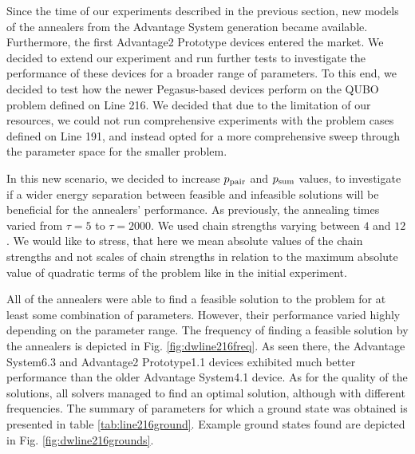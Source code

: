 Since the time of our experiments described in the previous section, new models
of the annealers from the Advantage System generation became available.
Furthermore, the first Advantage2 Prototype devices entered the market. We
decided to extend our experiment and run further tests to investigate the
performance of these devices for a broader range of parameters. To this end, we
decided to test how the newer Pegasus-based devices perform on the QUBO problem
defined on Line 216. We decided that due to the limitation of our resources, we
could not run comprehensive experiments with the problem cases defined on Line
191, and instead opted for a more comprehensive sweep through the parameter
space for the smaller problem.

In this new scenario, we decided to increase $p_{\text{pair}}$ and $p_{\text{sum}}$ values, to
investigate if a wider energy separation between feasible and infeasible
solutions will be beneficial for the annealers' performance. As previously, the
annealing times varied from $\tau=5$ to $\tau=2000$. We used chain strengths
varying between $4$ and $12$. We would like to stress, that here we mean
absolute values of the chain strengths and not scales of chain strengths in
relation to the maximum absolute value of quadratic terms of the problem like
in the initial experiment.

All of the annealers were able to find a feasible solution to the problem for
at least some combination of parameters. However, their performance varied
highly depending on the parameter range. The frequency of finding a feasible
solution by the annealers is depicted in Fig. \ref{fig:dwline216freq}. As seen
there, the Advantage System6.3 and Advantage2 Prototype1.1 devices exhibited
much better performance than the older Advantage System4.1 device. As for the
quality of the solutions, all solvers managed to find an optimal solution,
although with different frequencies. The summary of parameters for which a
ground state was obtained is presented in table \ref{tab:line216ground}.
Example ground states found are depicted in Fig. \ref{fig:dwline216grounds}.

